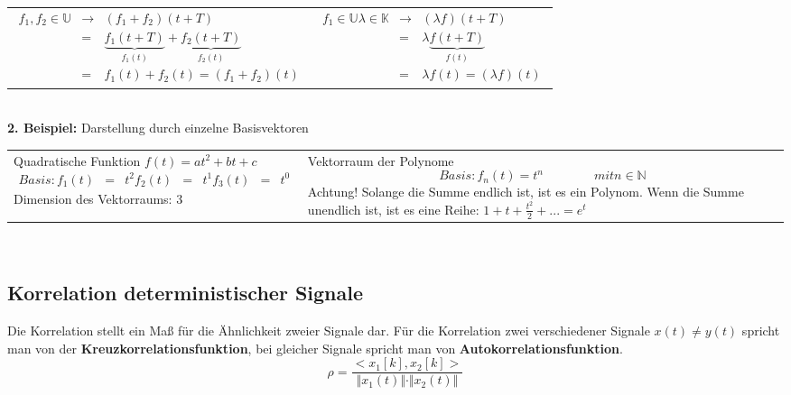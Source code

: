 	\begin{tabular}{ll}
 \parbox{6cm}{
	\begin{eqnarray*}
		f_1, f_2 \in \mathbb{U} &\rightarrow & (f_1 + f_2)(t+T)\\
		 &=& \underbrace{f_1(t+T)}_{\text{$f_1(t)$}} + \underbrace{f_2(t+T)}_{\text{$f_2(t)$}}\\
		 &=& f_1(t) + f_2(t) =(f_1 + f_2) (t)
	\end{eqnarray*}}
 &
 \parbox{6cm}{
	\begin{eqnarray*}
		f_1 \in \mathbb{U} \lambda \in \mathbb{K} &\rightarrow & (\lambda f)(t+T)\\
		 &=& \lambda \underbrace{f(t+T)}_{\text{$f(t)$}}\\
		 &=& \lambda f(t) =(\lambda f) (t)
	\end{eqnarray*}}
\end{tabular}\\
\vspace{6pt}
\textbf{2. Beispiel:} \quad Darstellung durch einzelne Basisvektoren
	\begin{tabular}{ll}
 \parbox{5cm}{
 	Quadratische Funktion\\ $f(t) = at^2+bt+c$\\	
	\begin{eqnarray*}
		Basis: f_1(t) &=& t^2\\
		f_2(t)&=& t^1\\
		f_3(t)&=& t^0
	\end{eqnarray*}
Dimension des Vektorraums: 3	
	}
 &
 \parbox{5cm}{
 Vektorraum der Polynome\\
 \begin{equation*}
 Basis: f_n(t) = t^n \qquad \qquad mit n \in \mathbb{N}
 \end{equation*}
 \centering
Achtung! Solange die Summe endlich ist, ist es ein Polynom. Wenn die Summe unendlich ist, ist es eine Reihe: $1+t+\frac{t^2}{2}+... = e^t$}
\end{tabular}\\
\vspace{12pt}
\subsection{Korrelation deterministischer Signale}
Die Korrelation stellt ein Maß für die Ähnlichkeit zweier Signale dar. Für die Korrelation zwei verschiedener Signale $x(t) \ne y(t)$ spricht man von der \textbf{Kreuzkorrelationsfunktion}, bei gleicher Signale spricht man von \textbf{Autokorrelationsfunktion}.
\begin{equation*}
\rho = \frac{< x_1[k], x_2[k]>}{\Vert x_1(t) \Vert \cdot \Vert x_2(t) \Vert}
\end{equation*}\\~
\vfill\columnbreak

